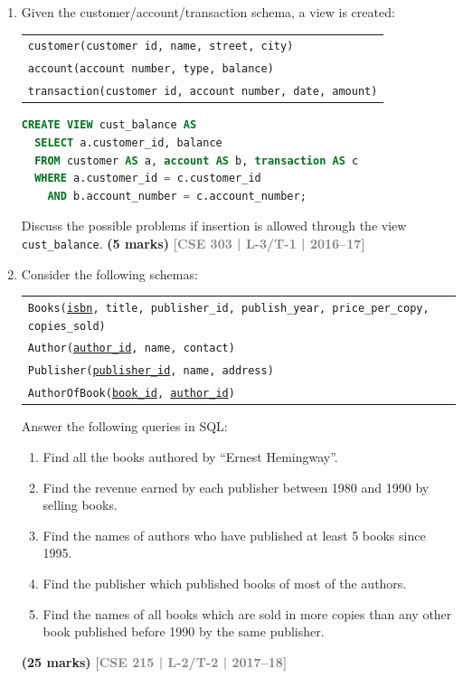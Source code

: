 \documentclass[12pt,a3paper]{article}
\newcommand{\yr}[1]{\hfill\textcolor{gray}{\small\textbf{[#1]}}}
\newcommand{\mk}[1]{\textcolor{orange!70!black}{\small\textbf{(#1 marks)}}}
\begin{document}
\begin{enumerate}
\item Given the customer/account/transaction schema, a view is created:
\begin{center}
  \begin{tabular}{l}
    \texttt{customer(customer id, name, street, city)}\\
    \texttt{account(account number, type, balance)}\\
    \texttt{transaction(customer id, account number, date, amount)}
  \end{tabular}
\end{center}

\begin{lstlisting}[language=SQL]
CREATE VIEW cust_balance AS
  SELECT a.customer_id, balance
  FROM customer AS a, account AS b, transaction AS c
  WHERE a.customer_id = c.customer_id
    AND b.account_number = c.account_number;
\end{lstlisting}
Discuss the possible problems if insertion is allowed through the view \texttt{cust\_balance}.
\mk{5} \yr{CSE 303 | L-3/T-1 | 2016--17}

\item Consider the following schemas:
\begin{center}
\begin{tabular}{l}
\texttt{Books(\underline{isbn}, title, publisher\_id, publish\_year, price\_per\_copy, copies\_sold)}\\
\texttt{Author(\underline{author\_id}, name, contact)}\\
\texttt{Publisher(\underline{publisher\_id}, name, address)}\\
\texttt{AuthorOfBook(\underline{book\_id}, \underline{author\_id})}
\end{tabular}
\end{center}
Answer the following queries in SQL:
\begin{enumerate}
  \item Find all the books authored by ``Ernest Hemingway''.
  \item Find the revenue earned by each publisher between 1980 and 1990 by selling books.
  \item Find the names of authors who have published at least 5 books since 1995.
  \item Find the publisher which published books of most of the authors.
  \item Find the names of all books which are sold in more copies than any other book published before 1990 by the same publisher.
\end{enumerate}
\mk{25} \yr{CSE 215 | L-2/T-2 | 2017--18}


\end{enumerate}
\end{document}
